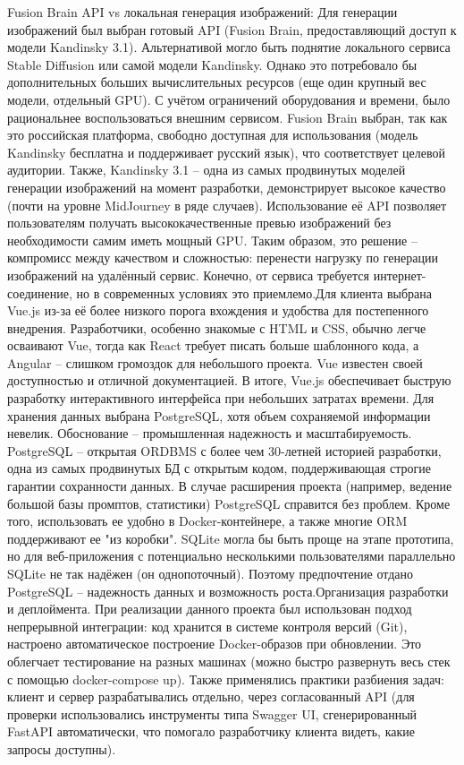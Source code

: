 Fusion Brain API vs локальная генерация изображений: Для генерации изображений был выбран готовый API (Fusion Brain, предоставляющий доступ к модели Kandinsky 3.1)\cite{sitelabs:kandinsky}. Альтернативой могло быть поднятие локального сервиса Stable Diffusion или самой модели Kandinsky. Однако это потребовало бы дополнительных больших вычислительных ресурсов (еще один крупный вес модели, отдельный GPU). С учётом ограничений оборудования и времени, было рациональнее воспользоваться внешним сервисом. Fusion Brain выбран, так как это российская платформа, свободно доступная для использования (модель Kandinsky бесплатна и поддерживает русский язык\cite{sitelabs:kandinsky}), что соответствует целевой аудитории. Также, Kandinsky 3.1 – одна из самых продвинутых моделей генерации изображений на момент разработки, демонстрирует высокое качество (почти на уровне MidJourney в ряде случаев). Использование её API позволяет пользователям получать высококачественные превью изображений без необходимости самим иметь мощный GPU. Таким образом, это решение – компромисс между качеством и сложностью: перенести нагрузку по генерации изображений на удалённый сервис. Конечно, от сервиса требуется интернет-соединение, но в современных условиях это приемлемо.Для клиента выбрана Vue.js из-за её более низкого порога вхождения и удобства для постепенного внедрения. Разработчики, особенно знакомые с HTML и CSS, обычно легче осваивают Vue, тогда как React требует писать больше шаблонного кода, а Angular – слишком громоздок для небольшого проекта. Vue известен своей доступностью и отличной документацией\cite{vuejs:wiki}. В итоге, Vue.js обеспечивает быструю разработку интерактивного интерфейса при небольших затратах времени. Для хранения данных выбрана PostgreSQL, хотя объем сохраняемой информации невелик. Обоснование – промышленная надежность и масштабируемость. PostgreSQL – открытая ORDBMS с более чем 30-летней историей разработки, одна из самых продвинутых БД с открытым кодом\cite{postgresql:skillfactory}, поддерживающая строгие гарантии сохранности данных. В случае расширения проекта (например, ведение большой базы промптов, статистики) PostgreSQL справится без проблем. Кроме того, использовать ее удобно в Docker-контейнере, а также многие ORM поддерживают ее "из коробки". SQLite могла бы быть проще на этапе прототипа, но для веб-приложения с потенциально несколькими пользователями параллельно SQLite не так надёжен (он однопоточный). Поэтому предпочтение отдано PostgreSQL – надежность данных и возможность роста.Организация разработки и деплоймента. При реализации данного проекта был использован подход непрерывной интеграции: код хранится в системе контроля версий (Git), настроено автоматическое построение Docker-образов при обновлении. Это облегчает тестирование на разных машинах (можно быстро развернуть весь стек с помощью docker-compose up). Также применялись практики разбиения задач: клиент и сервер разрабатывались отдельно, через согласованный API (для проверки использовались инструменты типа Swagger UI, сгенерированный FastAPI автоматически, что помогало разработчику клиента видеть, какие запросы доступны).

